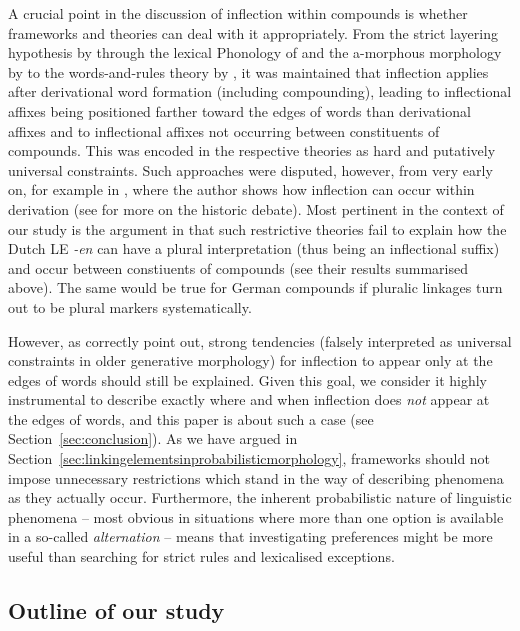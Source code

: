 A crucial point in the discussion of inflection within compounds is whether frameworks and theories can deal with it appropriately.
From the strict layering hypothesis by \textcite{Siegel1979} through the lexical Phonology of \textcite{Mohanan1986} and the a-morphous morphology by \textcite{Anderson1992} to the words-and-rules theory by \textcite{Pinker1999}, it was maintained that inflection applies after derivational word formation (including compounding), leading to inflectional affixes being positioned farther toward the edges of words than derivational affixes and to inflectional affixes not occurring between constituents of compounds.
This was encoded in the respective theories as hard and putatively universal constraints.
Such approaches were disputed, however, from very early on, for example in \textcite{Bochner1984}, where the author shows how inflection can occur within derivation (see \citealt[2--3]{KirchnerNicoladis2009} for more on the historic debate).
Most pertinent in the context of our study is the argument in \textcite[47--48]{BangaEa2013a} that such restrictive theories fail to explain how the Dutch LE \textit{-en} can have a plural interpretation (thus being an inflectional suffix) and occur between constiuents of compounds (see their results summarised above).
The same would be true for German compounds if pluralic linkages turn out to be plural markers systematically.

However, as \textcite[5]{KirchnerNicoladis2009} correctly point out, strong tendencies (falsely interpreted as universal constraints in older generative morphology) for inflection to appear only at the edges of words should still be explained.
Given this goal, we consider it highly instrumental to describe exactly where and when inflection does \textit{not} appear at the edges of words, and this paper is about such a case (see Section~\ref{sec:conclusion}).
As we have argued in Section~\ref{sec:linkingelementsinprobabilisticmorphology}, frameworks should not impose unnecessary restrictions which stand in the way of describing phenomena as they actually occur.
Furthermore, the inherent probabilistic nature of linguistic phenomena -- most obvious in situations where more than one option is available in a so-called \textit{alternation} -- means that investigating preferences might be more useful than searching for strict rules and lexicalised exceptions.

\subsection{Outline of our study}

